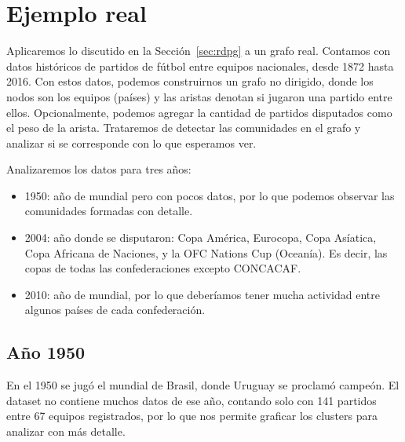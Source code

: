\documentclass{article}
\begin{document}
\section{Ejemplo real}
\label{sec:ejemplo_real}

Aplicaremos lo discutido en la Sección~\ref{sec:rdpg} a un grafo real. Contamos con datos históricos de partidos de fútbol entre equipos nacionales, desde 1872
hasta 2016. Con estos datos, podemos construirnos un grafo no dirigido, donde los nodos son los equipos (países) y las aristas denotan si jugaron una partido entre ellos.
Opcionalmente, podemos agregar la cantidad de partidos disputados como el peso de la arista. Trataremos de detectar las comunidades en el grafo y analizar si se corresponde con lo que esperamos ver.

Analizaremos los datos para tres años:
\begin{itemize}
    \item 1950: año de mundial pero con pocos datos, por lo que podemos observar las comunidades formadas con detalle.
    \item 2004: año donde se disputaron: Copa América, Eurocopa, Copa Asíatica, Copa Africana de Naciones, 
    y la OFC Nations Cup (Oceanía). Es decir, las copas de todas las confederaciones excepto CONCACAF.
    \item 2010: año de mundial, por lo que deberíamos tener mucha actividad entre algunos países de cada confederación.
\end{itemize}

\subsection{Año 1950}

En el 1950 se jugó el mundial de Brasil, donde Uruguay se proclamó campeón. El dataset no contiene muchos datos de ese año, contando solo con 141 partidos entre 67 equipos registrados, por lo que
nos permite graficar los clusters para analizar con más detalle.
\end{document}
